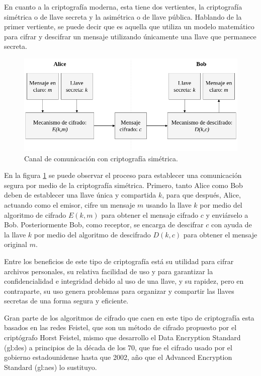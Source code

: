   En cuanto a la criptografía moderna, esta tiene dos vertientes, la
  criptografía simétrica o de llave secreta y la asimétrica o de llave
  pública. Hablando de la primer vertiente, se puede decir que es aquella
  que utiliza un modelo matemático para cifrar y descifrar un mensaje
  utilizando únicamente una llave que permanece secreta.

  \begin{figure}[H]
    \begin{center}
      \includegraphics[width=0.8\linewidth]
        {contenidos/antecedentes/intro/img/cripto_simetrica.png}
      \caption{Canal de comunicación con criptografía simétrica.}
      \label{cripto_simetrica}
    \end{center}
  \end{figure}

  En la figura \ref{cripto_simetrica} se puede observar el proceso para 
  establecer una comunicación segura por medio de la criptografía simétrica. 
  Primero, tanto Alice como Bob deben de establecer una llave única y 
  compartida $k$, para que después, Alice, actuando como el emisor, cifre un 
  mensaje $m$ usando la llave $k$ por medio del algoritmo de cifrado $E(k,m)$ 
  para obtener el mensaje cifrado $c$ y enviárselo a Bob. Posteriormente Bob, 
  como receptor, se encarga de descifrar $c$ con ayuda de la llave $k$ por 
  medio del algoritmo de descifrado $D(k,c)$ para obtener el mensaje original 
  $m$.

  Entre los beneficios de este tipo de criptografía está su utilidad para
  cifrar archivos personales, su relativa facilidad de uso y para garantizar
  la confidencialidad e integridad debido al uso de una llave, y su rapidez,
  pero en contraparte, su uso genera problemas para organizar y compartir
  las llaves secretas de una forma segura y eficiente.

  Gran parte de los algoritmos de cifrado que caen en este tipo de criptografía 
  esta basados en las redes Feistel, que son un método de cifrado propuesto por 
  el criptógrafo Horst Feistel, mismo que desarrollo el Data Encryption Standard 
  (\acrshort{gl:des}) a principios de la década de los 70, que fue el cifrado 
  usado por el gobierno estadounidense hasta que 2002, año que el Advanced 
  Encryption Standard (\acrshort{gl:aes}) lo sustituyo. 

